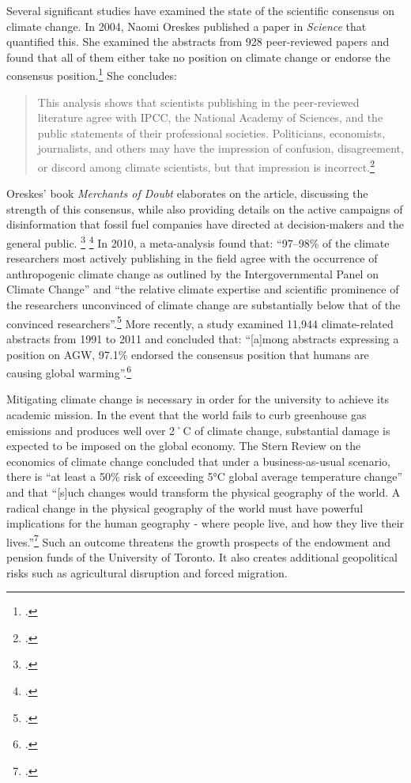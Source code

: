 Several significant studies have examined the state of the scientific consensus on climate change.
In 2004, Naomi Oreskes published a paper in \emph{Science} that quantified this.
She examined the abstracts from 928 peer-reviewed papers and found that all of them either take no position on climate change or endorse the consensus position.\footcite[][p. 1686]{Oreskes2004}
She concludes:
\begin{quote}
This analysis shows that scientists publishing in the peer-reviewed literature agree with IPCC, the National Academy of Sciences, and the public statements of their professional societies. Politicians, economists, journalists, and others may have the impression of confusion, disagreement, or discord among climate scientists, but that impression is incorrect.\footcite[][p. 1686]{Oreskes2004}
\end{quote}
Oreskes' book \emph{Merchants of Doubt} elaborates on the article, discussing the strength of this consensus, while also providing details on the active campaigns of disinformation that fossil fuel companies have directed at decision-makers and the general public. \footcite[][]{MerchantsDoubt} \footcite[See also: ][]{ClimateCoverUp}
In 2010, a meta-analysis found that: ``97–98\% of the climate researchers most actively publishing in the field agree with the occurrence of anthropogenic climate change as outlined by the Intergovernmental Panel on Climate Change'' and ``the relative climate expertise and scientific prominence of the researchers unconvinced of climate change are substantially below that of the convinced researchers''.\footcite[][p. 1]{ExpertCredibility}
More recently, a study examined 11,944 climate-related abstracts from 1991 to 2011 and concluded that: ``[a]mong abstracts expressing a position on AGW, 97.1\% endorsed the consensus position that humans are causing global warming''.\footcite[][]{QuantConsensus}


Mitigating climate change is necessary in order for the university to achieve its academic mission. 
In the event that the world fails to curb greenhouse gas emissions and produces well over 2˚C of climate change, substantial damage is expected to be imposed on the global economy.
The Stern Review on the economics of climate change concluded that under a business-as-usual scenario, there is ``at least a 50\% risk of exceeding 5°C global average temperature change'' and that ``[s]uch changes would transform the physical geography of the world. A radical change in the physical geography of the world must have powerful implications for the human geography - where people live, and how they live their lives.''\footcite[][See long executive summary at: \url{http://www.hm-treasury.gov.uk/d/Executive_Summary.pdf}]{Stern2007}
Such an outcome threatens the growth prospects of the endowment and pension funds of the University of Toronto. 
It also creates additional geopolitical risks such as agricultural disruption and forced migration.



